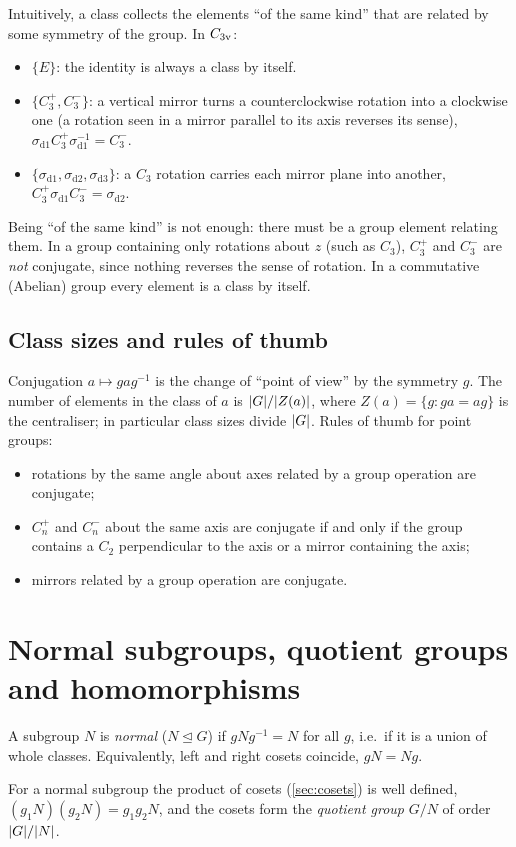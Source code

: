 Intuitively, a class collects the elements ``of the same kind'' that are related by
some symmetry of the group. In $C_{3\mathrm{v}}$:
\begin{itemize}
\item $\{E\}$: the identity is always a class by itself.
\item $\{C_3^+,C_3^-\}$: a vertical mirror turns a counterclockwise rotation into a
      clockwise one (a rotation seen in a mirror parallel to its axis reverses its
      sense), $\sigma_{\mathrm{d}1}C_3^+\sigma_{\mathrm{d}1}^{-1}=C_3^-$.
\item $\{\sigma_{\mathrm{d}1},\sigma_{\mathrm{d}2},\sigma_{\mathrm{d}3}\}$: a $C_3$
      rotation carries each mirror plane into another,
      $C_3^+\sigma_{\mathrm{d}1}C_3^-=\sigma_{\mathrm{d}2}$.
\end{itemize}
Being ``of the same kind'' is not enough: there must be a group element relating
them. In a group containing only rotations about $z$ (such as $C_3$), $C_3^+$ and
$C_3^-$ are \emph{not} conjugate, since nothing reverses the sense of rotation. In
a commutative (Abelian) group every element is a class by itself.

\subsection{Class sizes and rules of thumb\beyondmark}
Conjugation $a\mapsto gag^{-1}$ is the change of ``point of view'' by the symmetry $g$.
The number of elements in the class of $a$ is $\lvert G\rvert/\lvert Z(a)\rvert$, where
$Z(a)=\{g:ga=ag\}$ is the centraliser; in particular class sizes divide $\lvert G\rvert$.
Rules of thumb for point groups:
\begin{itemize}
\item rotations by the same angle about axes related by a group operation are
      conjugate;
\item $C_n^{+}$ and $C_n^{-}$ about the same axis are conjugate if and only if the group
      contains a $C_2$ perpendicular to the axis or a mirror containing the axis;
\item mirrors related by a group operation are conjugate.
\end{itemize}

\section{Normal subgroups, quotient groups and homomorphisms\beyondmark}\label{sec:normal}

\begin{definition}
A subgroup $N$ is \emph{normal} ($N\trianglelefteq G$) if $gNg^{-1}=N$ for all $g$,
i.e.\ if it is a union of whole classes. Equivalently, left and right cosets coincide,
$gN=Ng$.
\end{definition}
For a normal subgroup the product of cosets (\cref{sec:cosets}) is well defined,
$(g_1N)(g_2N)=g_1g_2N$, and the cosets form the \emph{quotient group} $G/N$ of order
$\lvert G\rvert/\lvert N\rvert$.

